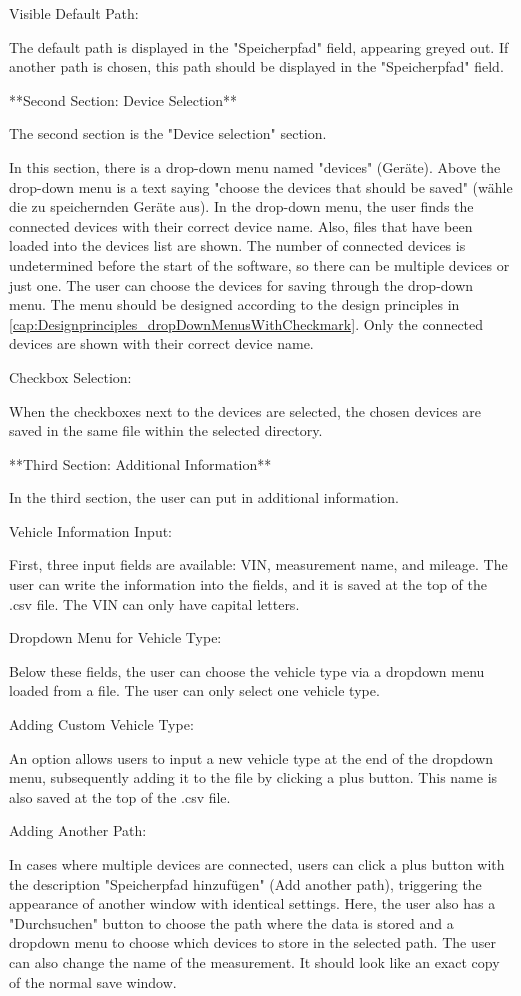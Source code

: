 \documentclass[]{scrreprt}
\begin{document}
Visible Default Path:

The default path is displayed in the "Speicherpfad" field, appearing greyed out. If another path is chosen, this path should be displayed in the "Speicherpfad" field.

**Second Section: Device Selection**

The second section is the "Device selection" section.

In this section, there is a drop-down menu named "devices" (Geräte). Above the drop-down menu is a text saying "choose the devices that should be saved" (wähle die zu speichernden Geräte aus). In the drop-down menu, the user finds the connected devices with their correct device name. Also, files that have been loaded into the devices list are shown. The number of connected devices is undetermined before the start of the software, so there can be multiple devices or just one. The user can choose the devices for saving through the drop-down menu. The menu should be designed according to the design principles in \ref{cap:Designprinciples_dropDownMenusWithCheckmark}. Only the connected devices are shown with their correct device name.

Checkbox Selection:

When the checkboxes next to the devices are selected, the chosen devices are saved in the same file within the selected directory.

**Third Section: Additional Information**

In the third section, the user can put in additional information.

Vehicle Information Input:

First, three input fields are available: VIN, measurement name, and mileage. The user can write the information into the fields, and it is saved at the top of the .csv file. The VIN can only have capital letters.

Dropdown Menu for Vehicle Type:

Below these fields, the user can choose the vehicle type via a dropdown menu loaded from a file. The user can only select one vehicle type.

Adding Custom Vehicle Type:

An option allows users to input a new vehicle type at the end of the dropdown menu, subsequently adding it to the file by clicking a plus button. This name is also saved at the top of the .csv file.

Adding Another Path:

In cases where multiple devices are connected, users can click a plus button with the description "Speicherpfad hinzufügen" (Add another path), triggering the appearance of another window with identical settings. Here, the user also has a "Durchsuchen" button to choose the path where the data is stored and a dropdown menu to choose which devices to store in the selected path. The user can also change the name of the measurement. It should look like an exact copy of the normal save window.
\end{document}
